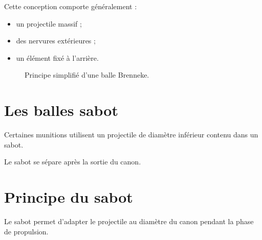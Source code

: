 Cette conception comporte généralement :

\begin{itemize}
    \item un projectile massif ;
    \item des nervures extérieures ;
    \item un élément fixé à l'arrière.
\end{itemize}

\begin{figure}[htbp]
\centering


\caption{Principe simplifié d'une balle Brenneke.}
\label{fig:balle_brenneke}

\end{figure}

\section{Les balles sabot}

Certaines munitions utilisent un projectile de diamètre inférieur contenu dans
un sabot.

Le sabot se sépare après la sortie du canon.

\section{Principe du sabot}

Le sabot permet d'adapter le projectile au diamètre du canon pendant la phase
de propulsion.

